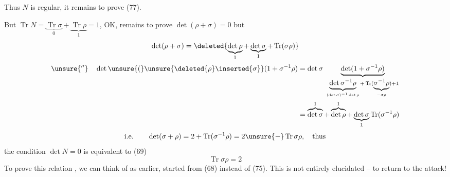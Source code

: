 Thus $N$ is regular, it remains to prove (77).

But $\operatorname{Tr}N=\underbrace{\operatorname{Tr}\sigma}_{0}+\underbrace{\operatorname{Tr}\rho}_{1}=1$, OK, remains to prove $\det(\rho+\sigma)=0$ but
\[
\det(\rho+\sigma)=\deleted{\underbrace{\det\rho}_{1}+\underbrace{\det\sigma}_{1}+\operatorname{Tr}(\sigma\rho)}
\]
\[
\begin{aligned}
\unsure{''}\quad
\det\unsure{(}\unsure{\deleted{\rho}\inserted{\sigma}}(1+\sigma^{-1}\rho)
&=\det\sigma\ \underbrace{\det(1+\sigma^{-1}\rho)}_{\underbrace{\det\sigma^{-1}\rho}_{(\det\sigma)^{-1}\det\rho}+\operatorname{Tr}(\underbrace{\sigma^{-1}\rho}_{-\sigma\rho})+1}\\
&=\overbrace{\det\sigma}^{1}+\overbrace{\det\rho}^{1}+\underbrace{\det\sigma}_{1}\operatorname{Tr}(\sigma^{-1}\rho)
\end{aligned}
\]
\[
\text{i.e.}\qquad\det(\sigma+\rho)=2+\operatorname{Tr}(\sigma^{-1}\rho)=2\unsure{-}\operatorname{Tr}\sigma\rho,\quad\text{thus}
\]
the condition $\det N=0$ is equivalent to (69)
\[
\operatorname{Tr}\sigma\rho=2
\]
To  prove this relation , we can think of  as earlier,   started from (68) instead of (75). This is not entirely elucidated -- to return to the attack!
